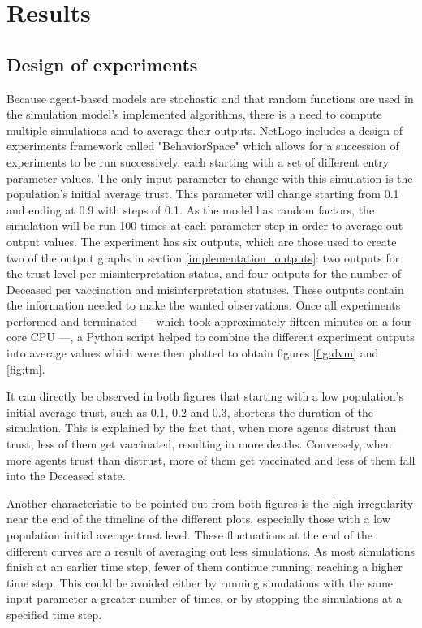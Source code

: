 \chapter{Results}

\section{Design of experiments}

Because agent-based models are stochastic and that random functions are used in the simulation model's implemented algorithms, there is a need to compute multiple simulations and to average their outputs. NetLogo includes a design of experiments framework called "BehaviorSpace" which allows for a succession of experiments to be run successively, each starting with a set of different entry parameter values. The only input parameter to change with this simulation is the population's initial average trust. This parameter will change starting from 0.1 and ending at 0.9 with steps of 0.1. As the model has random factors, the simulation will be run 100 times at each parameter step in order to average out output values.
The experiment has six outputs, which are those used to create two of the output graphs in section \ref{implementation_outputs}: two outputs for the trust level per misinterpretation status, and four outputs for the number of Deceased per vaccination and misinterpretation statuses. These outputs contain the information needed to make the wanted observations. Once all experiments performed and terminated --- which took approximately fifteen minutes on a four core CPU ---, a Python script helped to combine the different experiment outputs into average values which were then plotted to obtain figures \ref{fig:dvm} and \ref{fig:tm}.

It can directly be observed in both figures that starting with a low population's initial average trust, such as 0.1, 0.2 and 0.3, shortens the duration of the simulation. This is explained by the fact that, when more agents distrust than trust, less of them get vaccinated, resulting in more deaths. Conversely, when more agents trust than distrust, more of them get vaccinated and less of them fall into the Deceased state.

Another characteristic to be pointed out from both figures is the high irregularity near the end of the timeline of the different plots, especially those with a low population initial average trust level. These fluctuations at the end of the different curves are a result of averaging out less simulations. As most simulations finish at an earlier time step, fewer of them continue running, reaching a higher time step.
This could be avoided either by running simulations with the same input parameter a greater number of times, or by stopping the simulations at a specified time step.



